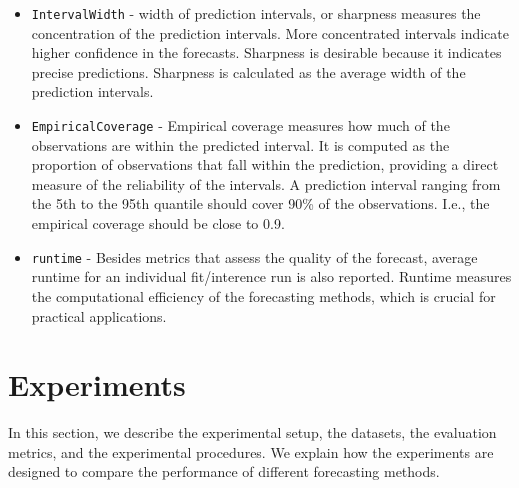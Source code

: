\begin{itemize}
    \item \texttt{IntervalWidth} - width of prediction intervals, or sharpness measures the concentration of the prediction intervals. More concentrated intervals indicate higher confidence in the forecasts. Sharpness is desirable because it indicates precise predictions. Sharpness is calculated as the average width of the prediction intervals.
    \item \texttt{EmpiricalCoverage} - Empirical coverage measures how much of the observations are within the predicted interval. It is computed as the proportion of observations that fall within the prediction, providing a direct measure of the reliability of the intervals. A prediction interval ranging from the 5th to the 95th quantile should cover 90\% of the observations. I.e., the empirical coverage should be close to 0.9.
    \item \texttt{runtime} - Besides metrics that assess the quality of the forecast, average runtime for an individual fit/interence run is also reported. Runtime measures the computational efficiency of the forecasting methods, which is crucial for practical applications.

\end{itemize}



\section{Experiments} \label{experiments}
In this section, we describe the experimental setup, the datasets, the evaluation metrics, and the experimental procedures. We explain how the experiments are designed to compare the performance of different forecasting methods.



